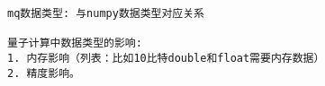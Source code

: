 \begin{lstlisting}
mq数据类型:	与numpy数据类型对应关系

量子计算中数据类型的影响:
1. 内存影响（列表：比如10比特double和float需要内存数据）
2. 精度影响。
\end{lstlisting}